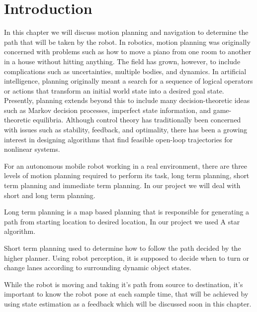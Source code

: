 \newline
\newline
\vspace{3mm}
\hfill

\section{Introduction}

\hspace{2cm} In this chapter we will discuss motion planning and navigation to determine the path that will be taken by the robot.
In robotics, motion planning was originally concerned with problems such as how to move a piano from one room to another in a house without
hitting anything. The field has grown, however, to include complications such as
uncertainties, multiple bodies, and dynamics. In artificial intelligence, planning
originally meant a search for a sequence of logical operators or actions that transform an initial world state into a desired goal state. Presently, planning extends
beyond this to include many decision-theoretic ideas such as Markov decision processes, imperfect state information, and game-theoretic equilibria. Although control theory has traditionally been concerned with issues such as stability, feedback,
and optimality, there has been a growing interest in designing algorithms that find
feasible open-loop trajectories for nonlinear systems.\cite{web039}
\par
For an autonomous mobile robot working in a real environment, there are three levels of motion planning required to perform its task, long term planning, short term planning and immediate term planning. In our project we will deal with short and long term planning.

\par
Long term planning is a map based planning that is responsible for generating a path from starting location to desired location, In our project we used A star algorithm.
\par
Short term planning used to determine how to follow the path decided by the higher planner. Using robot perception, it is supposed to decide when to turn or change lanes according to surrounding dynamic object states.

\par
While the robot is moving and taking it's path from source to destination, it's important to know the robot pose at each sample time, that will be achieved by using state estimation as a feedback which will be discussed soon in this chapter.

